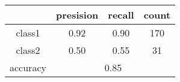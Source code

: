 
    \begin{tabular}{ | c | c | c | c | }
	\hline
	 & presision & recall & count \\ \hline
	class1 & 0.92 & 0.90 & 170 \\ \hline
	class2 & 0.50 & 0.55 & 31  \\ \hline
	\hline
	accuracy & \multicolumn{3}{c|}{0.85} \\
	\hline
    \end{tabular}